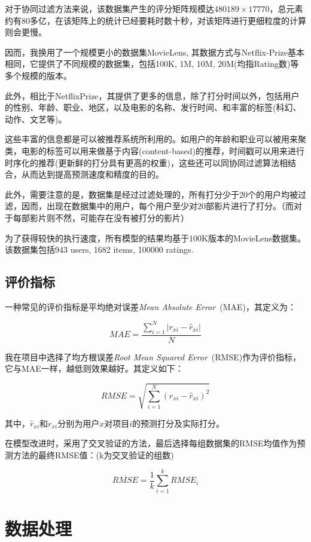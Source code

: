 \documentclass[utf8, a4paper, 11pt, onecolumn]{ctexart}
\begin{document}
\begin{spacing}{1.3}
对于协同过滤方法来说，该数据集产生的评分矩阵规模达$480189 \times 17770$，总元素约有80多亿，在该矩阵上的统计已经要耗时数十秒，对该矩阵进行更细粒度的计算则会更慢。

因而，我换用了一个规模更小的数据集MovieLens, 其数据方式与Netflix-Prize基本相同，它提供了不同规模的数据集，包括100K, 1M, 10M, 20M(均指Rating数)等多个规模的版本。

此外，相比于NetflixPrize，其提供了更多的信息，除了打分时间以外，包括用户的性别、年龄、职业、地区，以及电影的名称、发行时间、和丰富的标签(科幻、动作、文艺等)。

这些丰富的信息都是可以被推荐系统所利用的。如用户的年龄和职业可以被用来聚类，电影的标签可以用来做基于内容(content-based)的推荐，时间戳可以用来进行时序化的推荐(更新鲜的打分具有更高的权重)，这些还可以同协同过滤算法相结合，从而达到提高预测速度和精度的目的。

此外，需要注意的是，数据集是经过过滤处理的，所有打分少于20个的用户均被过滤，因而，出现在数据集中的用户，每个用户至少对20部影片进行了打分。（而对于每部影片则不然，可能存在没有被打分的影片）

为了获得较快的执行速度，所有模型的结果均基于100K版本的MovieLens数据集。该数据集包括943 users, 1682 items, 100000 ratings.

\subsection{评价指标}
\label{评价指标}

一种常见的评价指标是平均绝对误差\textit{Mean Absolute Error}\ (MAE)，其定义为：

\[MAE =\frac{\sum_{i=1}^{N} \lvert r_{xi} - \hat{r}_{xi}\rvert}{N} \]

我在项目中选择了均方根误差\textit{Root Mean Squared Error}\ (RMSE)作为评价指标，它与MAE一样，越低则效果越好。其定义如下：

\[RMSE = \sqrt{\sum_{i = 1}^{N}(r_{xi} - \hat{r}_{xi})^{2}}\]

其中，$\hat{r}_{xi}$和$r_{xi}$分别为用户$x$对项目$i$的预测打分及实际打分。

在模型改进时，采用了交叉验证的方法，最后选择每组数据集的RMSE均值作为预测方法的最终RMSE值：(k为交叉验证的组数)

\[\overline{RMSE} = \frac{1}{k}\sum_{i=1}^{k}RMSE_{i}\]

\section{数据处理}


\end{spacing}
\end{document}
